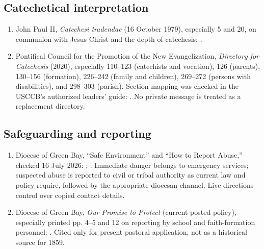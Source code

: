 \subsection{Catechetical interpretation}

\begin{enumerate}
  \item John Paul II, \emph{Catechesi tradendae} (16 October 1979), especially 5 and 20, on communion with Jesus Christ and the depth of catechesis: .
  \item Pontifical Council for the Promotion of the New Evangelization, \emph{Directory for Catechesis} (2020), especially 110--123 (catechists and vocation), 126 (parents), 130--156 (formation), 226--242 (family and children), 269--272 (persons with disabilities), and 298--303 (parish). Section mapping was checked in the USCCB's authorized leaders' guide: . No private message is treated as a replacement directory.
\end{enumerate}

\subsection{Safeguarding and reporting}

\begin{enumerate}
  \item Diocese of Green Bay, “Safe Environment” and “How to Report Abuse,” checked 16 July 2026: ; . Immediate danger belongs to emergency services; suspected abuse is reported to civil or tribal authority as current law and policy require, followed by the appropriate diocesan channel. Live directions control over copied contact details.
  \item Diocese of Green Bay, \emph{Our Promise to Protect} (current posted policy), especially printed pp. 4--5 and 12 on reporting by school and faith-formation personnel: . Cited only for present pastoral application, not as a historical source for 1859.
\end{enumerate}

\endgroup
